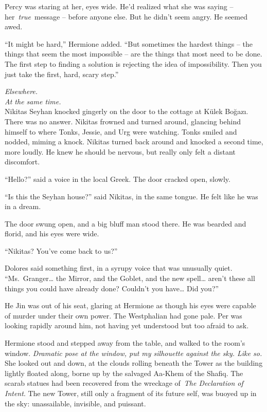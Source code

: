 Percy was staring at her, eyes wide. He'd realized what she was saying
-- her~\emph{true}~message -- before anyone else. But he didn't seem
angry. He seemed awed.

``It might be hard,'' Hermione added. ``But sometimes the hardest things
-- the things that seem the most impossible -- are the things that most
need to be done. The first step to finding a solution is rejecting the
idea of impossibility. Then you just take the first, hard, scary step.''

\mybreak

\emph{Elsewhere.}\\
\emph{At the same time.}\\

Nikitas Seyhan knocked gingerly on the door to the cottage at Külek
Boğazı. There was no answer. Nikitas frowned and turned around, glancing
behind himself to where Tonks, Jessie, and Urg were watching. Tonks
smiled and nodded, miming a knock. Nikitas turned back around and
knocked a second time, more loudly. He knew he should be nervous, but
really only felt a distant discomfort.

``Hello?'' said a voice in the local Greek. The door cracked open,
slowly.

``Is this the Seyhan house?'' said Nikitas, in the same tongue. He felt
like he was in a dream.

The door swung open, and a big bluff man stood there. He was bearded and
florid, and his eyes were wide.

``Nikitas? You've come back to us?''

\mybreak

Dolores said something first, in a syrupy voice that was unusually
quiet. ``Ms.~Granger\ldots{} the Mirror, and the Goblet, and the new
spell\ldots{} aren't these all things you could have already done?
Couldn't you have\ldots{} Did you?''

He Jin was out of his seat, glaring at Hermione as though his eyes were
capable of murder under their own power. The Westphalian had gone pale.
Per was looking rapidly around him, not having yet understood but too
afraid to ask.

Hermione stood and stepped away from the table, and walked to the room's
window. \emph{Dramatic pose at the window, put my silhouette against the
sky. Like so.} She looked out and down, at the clouds rolling beneath
the Tower as the building lightly floated along, borne up by the
salvaged Aa-Khem of the Shafiq. The scarab statues had been recovered
from the wreckage of~\emph{The Declaration of Intent}. The new Tower,
still only a fragment of its future self, was buoyed up in the sky:
unassailable, invisible, and puissant.

